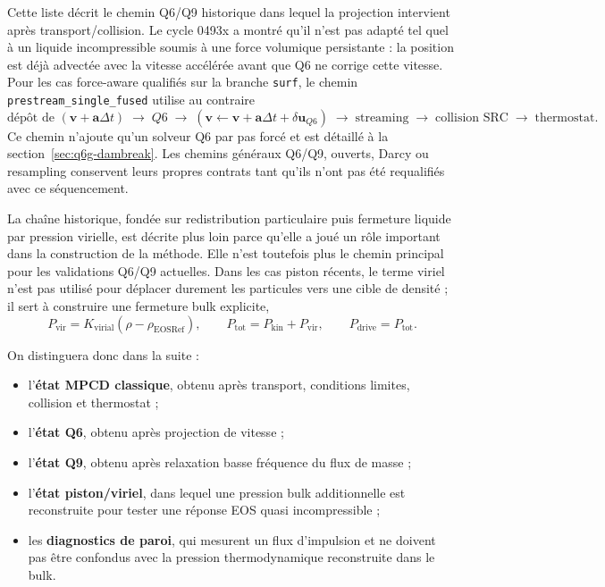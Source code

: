 \documentclass[11pt,a4paper]{article}
\begin{document}
Cette liste décrit le chemin Q6/Q9 historique dans lequel la projection intervient après transport/collision. Le cycle 0493x a montré qu'il n'est pas adapté tel quel à un liquide incompressible soumis à une force volumique persistante : la position est déjà advectée avec la vitesse accélérée avant que Q6 ne corrige cette vitesse. Pour les cas force-aware qualifiés sur la branche \texttt{surf}, le chemin \texttt{prestream\_single\_fused} utilise au contraire
\begin{equation}
  \text{dépôt de }(\bm v+\bm a\Delta t)
  \;\longrightarrow\; Q6
  \;\longrightarrow\; (\bm v\leftarrow\bm v+\bm a\Delta t+\delta\bm u_{Q6})
  \;\longrightarrow\; \text{streaming}
  \;\longrightarrow\; \text{collision SRC}
  \;\longrightarrow\; \text{thermostat}.
\end{equation}
Ce chemin n'ajoute qu'un solveur Q6 par pas forcé et est détaillé à la section~\ref{sec:q6g-dambreak}. Les chemins généraux Q6/Q9, ouverts, Darcy ou resampling conservent leurs propres contrats tant qu'ils n'ont pas été requalifiés avec ce séquencement.

La chaîne historique, fondée sur redistribution particulaire puis fermeture liquide par pression virielle, est décrite plus loin parce qu'elle a joué un rôle important dans la construction de la méthode. Elle n'est toutefois plus le chemin principal pour les validations Q6/Q9 actuelles. Dans les cas piston récents, le terme viriel n'est pas utilisé pour déplacer durement les particules vers une cible de densité ; il sert à construire une fermeture bulk explicite,
\begin{equation}
  P_{\mathrm{vir}} = K_{\mathrm{virial}}(\rho-\rho_{\mathrm{EOSRef}}),
  \qquad
  P_{\mathrm{tot}}=P_{\mathrm{kin}}+P_{\mathrm{vir}},
  \qquad
  P_{\mathrm{drive}}=P_{\mathrm{tot}}.
\end{equation}

On distinguera donc dans la suite :
\begin{itemize}
  \item l'\textbf{état MPCD classique}, obtenu après transport, conditions limites, collision et thermostat ;
  \item l'\textbf{état Q6}, obtenu après projection de vitesse ;
  \item l'\textbf{état Q9}, obtenu après relaxation basse fréquence du flux de masse ;
  \item l'\textbf{état piston/viriel}, dans lequel une pression bulk additionnelle est reconstruite pour tester une réponse EOS quasi incompressible ;
  \item les \textbf{diagnostics de paroi}, qui mesurent un flux d'impulsion et ne doivent pas être confondus avec la pression thermodynamique reconstruite dans le bulk.
\end{itemize}
\end{document}

